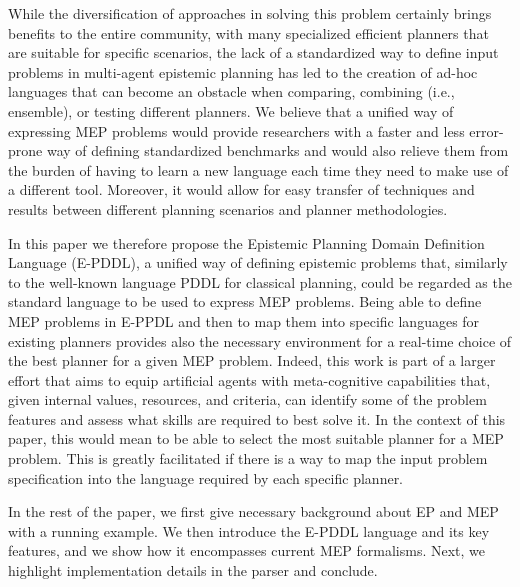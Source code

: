 While the diversification of approaches in solving this problem certainly brings benefits to the entire community, with many specialized efficient planners that are suitable for specific scenarios, the lack of a standardized way to define input problems in multi-agent epistemic planning has led to the creation of ad-hoc languages that can become an obstacle 
when comparing, combining (i.e., ensemble), or testing different planners.
We believe that a unified way of expressing MEP problems would provide researchers with a faster and less error-prone way of defining standardized benchmarks and would also relieve them from the burden of having to learn a new language each time they need to make use of a different tool.
Moreover, it would allow for easy transfer of techniques and results between different planning scenarios and planner methodologies.


In this paper we therefore propose the Epistemic Planning Domain Definition Language (E-PDDL), a unified way of defining epistemic problems that, similarly to the well-known language PDDL for classical planning, could be regarded as the standard 
language to be used to express MEP problems.
Being able to define MEP problems in E-PPDL and then to map them into 
specific languages for existing planners provides also the necessary 
environment for a real-time choice of the best planner for a given MEP problem. Indeed, this work is part of a larger effort that aims to equip artificial agents with meta-cognitive capabilities that, given internal values, resources, and criteria, can identify some of the problem features and assess what skills are required to best solve it. In the context of this paper, this would mean to be able to select the most suitable planner for a MEP problem. This is greatly facilitated if there is a way to map the input problem specification into the language required by each specific planner.

In the rest of the paper, we  first give necessary background about EP and MEP with a running example. We then introduce the E-PDDL language and its key features, and we show how it encompasses current MEP formalisms. Next, we highlight implementation details in the parser and conclude.
